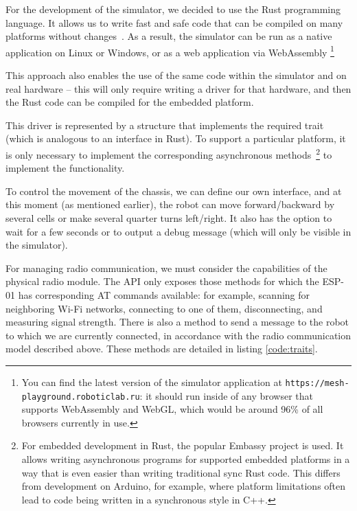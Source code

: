 \documentclass[%
]{article}
\begin{document}
For the development of the simulator, we decided to use the Rust programming language.
It allows us to write fast and safe code that can be compiled
on many platforms without changes~\cite{10.1145/2663171.2663188}.
As a result, the simulator can be run as a native application on Linux or Windows, or as a web application via WebAssembly
\footnote{You can find the latest version of the simulator application at \texttt{https://mesh-playground.roboticlab.ru}:
it should run inside of any browser that supports WebAssembly and WebGL, which would be around 96\% of all browsers currently in use.}

This approach also enables the use of the same code within the simulator and on real hardware -- 
this will only require writing a driver for that hardware, and then the Rust code can be compiled for the embedded platform.

This driver is represented by a structure that implements the required trait
(which is analogous to an interface in Rust).
To support a particular platform, it is only necessary to implement the corresponding asynchronous methods~\footnote{For
embedded development in Rust, the popular Embassy project is used.
It allows writing asynchronous programs for supported embedded platforms
in a way that is even easier than writing traditional sync Rust code.
This differs from development on Arduino, for example,
where platform limitations often lead to code being written in a synchronous style in C++.}
to implement the functionality.

To control the movement of the chassis, we can define our own interface,
and at this moment (as mentioned earlier), the robot can move forward/backward by several cells or make several quarter turns left/right.
It also has the option to wait for a few seconds or to output a debug message (which will only be visible in the simulator).

For managing radio communication, we must consider the capabilities of the physical radio module.
The API only exposes those methods for which the ESP-01 has corresponding AT commands available:
for example, scanning for neighboring Wi-Fi networks, connecting to one of them, disconnecting,
and measuring signal strength. There is also a method to send a message to the robot to which we
are currently connected, in accordance with the radio communication model described above. These methods are detailed in listing \ref{code:traits}.
\end{document}
